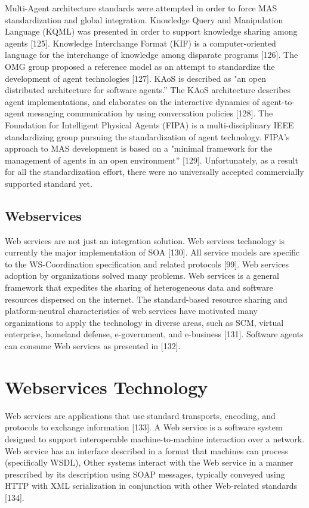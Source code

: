 \documentclass[12pt,a4paper,final,twoside,onecolumn,titlepage]{book}
\begin{document}
Multi-Agent architecture standards were attempted in order to force \gls{MAS} standardization and global integration. Knowledge Query and Manipulation Language (\gls{KQML}) was presented in order to support knowledge sharing among agents [125]. Knowledge Interchange Format (\gls{KIF}) is a computer-oriented language for the interchange of knowledge among disparate programs [126]. The OMG group proposed a reference model as an attempt to standardize the development of agent technologies [127]. \gls{KAoS} is described as "an open distributed architecture for software agents.'' The \gls{KAoS} architecture describes agent implementations, and elaborates on the interactive dynamics of agent-to-agent messaging communication by using conversation policies [128]. The Foundation for Intelligent Physical Agents (\gls{FIPA}) is a multi-disciplinary IEEE standardizing group pursuing the standardization of agent technology. \gls{FIPA}'s approach to \gls{MAS} development is based on a "minimal framework for the management of agents in an open environment'' [129]. Unfortunately, as a result for all the standardization effort, there were no universally accepted commercially supported standard yet.
\subsection{Webservices}
Web services are not just an integration solution. Web services technology is currently the major implementation of \gls{SOA} [130]. All service models are specific to the WS-Coordination specification and related protocols [99]. Web services adoption by organizations solved many problems. Web services is a general framework that expedites the sharing of heterogeneous data and software resources dispersed on the internet. The standard-based resource sharing and platform-neutral characteristics of web services have motivated many organizations to apply the technology in diverse areas, such as \gls{SCM}, virtual enterprise, homeland defense, e-government, and e-business [131]. Software agents can consume Web services as presented in [132].
\section{Webservices Technology}
Web services are applications that use standard transports, encoding, and protocols to exchange information [133]. A Web service is a software system designed to support interoperable machine-to-machine interaction over a network. Web service has an interface described in a format that machines can process (specifically \gls{WSDL}), Other systems interact with the Web service in a manner prescribed by its description using \gls{SOAP} messages, typically conveyed using \gls{HTTP} with \gls{XML} serialization in conjunction with other Web-related standards [134].
\end{document}
